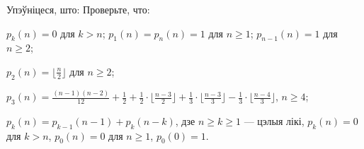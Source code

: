 \begin{problemList}
\bigskip

\problemItemWithCommonPart
{Упэўніцеся, што:}
{Проверьте, что:}
{\begin{belarusianEnumerate}
  \item $p_k(n) = 0$ для $k > n$; $p_1(n) = p_n(n) = 1$ для $n \ge 1$; $p_{n - 1}(n) = 1$ для $n \ge 2$;
  \item $p_2(n) = \bigl\lfloor \frac{n}{2} \bigr\rfloor$ для $n \ge 2$;
  \item $p_3(n) = \frac{(n - 1)(n - 2)}{12} + \frac{1}{2} + \frac{1}{2} \cdot \bigl\lfloor
  \frac{n - 3}{2} \bigr\rfloor + \frac{1}{3} \cdot \bigl\lfloor \frac{n - 3}{3} \bigr\rfloor -
  \frac{1}{3} \cdot \bigl\lfloor \frac{n - 4}{3}\bigr\rfloor$, $n \ge 4$;
  \item $p_k(n) = p_{k - 1}(n - 1) + p_k(n - k)$, дзе $n \ge k \ge 1$ --- цэлыя лікі,
  $p_k(n) = 0$ для $k > n$, $p_0(n) = 0$ для $n \ge 1$, $p_0(0) = 1$.
\end{belarusianEnumerate}}

\end{problemList}


